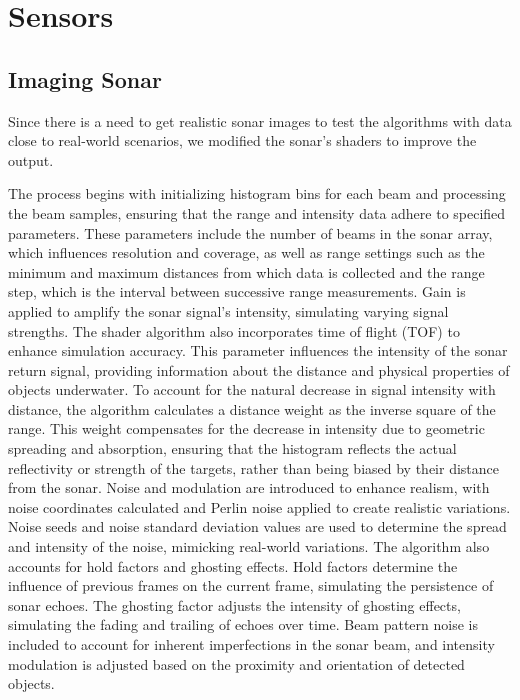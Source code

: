 \section{Sensors}
\subsection{Imaging Sonar}

Since there is a need to get realistic sonar images to test the algorithms with data close to real-world scenarios, we modified the sonar's shaders to improve the output. 

The process begins with initializing histogram bins for each beam and processing the beam samples, ensuring that the range and intensity data adhere to specified parameters. These parameters include the number of beams in the sonar array, which influences resolution and coverage, as well as range settings such as the minimum and maximum distances from which data is collected and the range step, which is the interval between successive range measurements. Gain is applied to amplify the sonar signal's intensity, simulating varying signal strengths.
The shader algorithm also incorporates time of flight (TOF) to enhance simulation accuracy. This parameter influences the intensity of the sonar return signal, providing information about the distance and physical properties of objects underwater. To account for the natural decrease in signal intensity with distance, the algorithm calculates a distance weight as the inverse square of the range. This weight compensates for the decrease in intensity due to geometric spreading and absorption, ensuring that the histogram reflects the actual reflectivity or strength of the targets, rather than being biased by their distance from the sonar.
Noise and modulation are introduced to enhance realism, with noise coordinates calculated and Perlin noise applied to create realistic variations. Noise seeds and noise standard deviation values are used to determine the spread and intensity of the noise, mimicking real-world variations. The algorithm also accounts for hold factors and ghosting effects. Hold factors determine the influence of previous frames on the current frame, simulating the persistence of sonar echoes. The ghosting factor adjusts the intensity of ghosting effects, simulating the fading and trailing of echoes over time.
Beam pattern noise is included to account for inherent imperfections in the sonar beam, and intensity modulation is adjusted based on the proximity and orientation of detected objects. 

